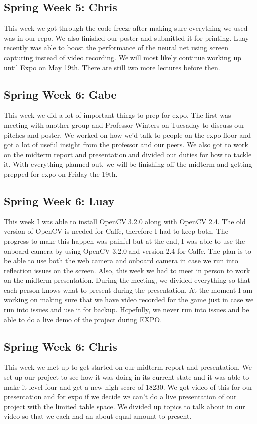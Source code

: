 \documentclass[onecolumn, draftclsnofoot,10pt, compsoc]{IEEEtran}
\begin{document}
\subsection{Spring Week 5: Chris}
This week we got through the code freeze after making sure everything we used was in our repo. We also finished our poster and submitted it for printing. Luay recently was able to boost the performance of the neural net using screen capturing instead of video recording. We will most likely continue working up until Expo on May 19th. There are still two more lectures before then.
\subsection{Spring Week 6: Gabe}
This week we did a lot of important things to prep for expo. The first was meeting with another group and Professor Winters on Tuesaday to discuss our pitches and poster. We worked on how we'd talk to people on the expo floor and got a lot of useful insight from the professor and our peers. We also got to work on the midterm report and presentation and divided out duties for how to tackle it. With everything planned out, we will be finishing off the midterm and getting prepped for expo on Friday the 19th.
\subsection{Spring Week 6: Luay}
This week I was able to install OpenCV 3.2.0 along with OpenCV 2.4. The old version of OpenCV is needed for Caffe, therefore I had to keep both. The progress to make this happen was painful but at the end, I was able to use the onboard camera by using OpenCV 3.2.0 and version 2.4 for Caffe. The plan is to be able to use both the web camera and onboard camera in case we run into reflection issues on the screen. Also, this week we had to meet in person to work on the midterm presentation. During the meeting, we divided everything so that each person knows what to present during the presentation. At the moment I am working on making sure that we have video recorded for the game just in case we run into issues and use it for backup. Hopefully, we never run into issues and be able to do a live demo of the project during EXPO.
\subsection{Spring Week 6: Chris}
This week we met up to get started on our midterm report and presentation. We set up our project to see how it was doing in its current state and it was able to make it level four and get a new high score of 18230. We got video of this for our presentation and for expo if we decide we can't do a live presentation of our project with the limited table space. We divided up topics to talk about in our video so that we each had an about equal amount to present.
\end{document}
